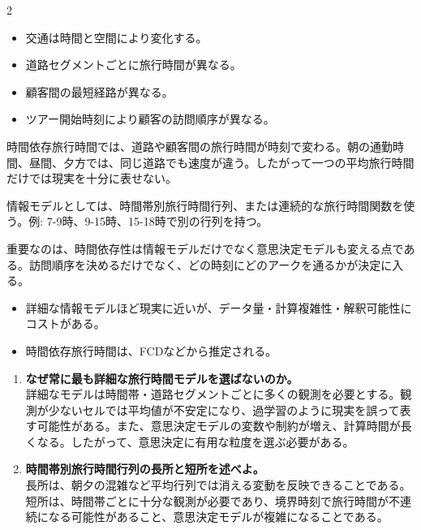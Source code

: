 \clearpage
{}
\begin{multicols}{2}\footnotesize\raggedcolumns
{}
\begin{itemize}
\item 交通は時間と空間により変化する。
\item 道路セグメントごとに旅行時間が異なる。
\item 顧客間の最短経路が異なる。
\item ツアー開始時刻により顧客の訪問順序が異なる。
\end{itemize}
時間依存旅行時間では、道路や顧客間の旅行時間が時刻で変わる。朝の通勤時間、昼間、夕方では、同じ道路でも速度が違う。したがって一つの平均旅行時間だけでは現実を十分に表せない。\par

情報モデルとしては、時間帯別旅行時間行列、または連続的な旅行時間関数を使う。例: 7-9時、9-15時、15-18時で別の行列を持つ。\par

重要なのは、時間依存性は情報モデルだけでなく意思決定モデルも変える点である。訪問順序を決めるだけでなく、どの時刻にどのアークを通るかが決定に入る。\par
{}
\begin{itemize}
\item 詳細な情報モデルほど現実に近いが、データ量・計算複雑性・解釈可能性にコストがある。
\item 時間依存旅行時間は、FCDなどから推定される。
\end{itemize}
\begin{enumerate}
\item \textbf{なぜ常に最も詳細な旅行時間モデルを選ばないのか。}\\詳細なモデルは時間帯・道路セグメントごとに多くの観測を必要とする。観測が少ないセルでは平均値が不安定になり、過学習のように現実を誤って表す可能性がある。また、意思決定モデルの変数や制約が増え、計算時間が長くなる。したがって、意思決定に有用な粒度を選ぶ必要がある。
\item \textbf{時間帯別旅行時間行列の長所と短所を述べよ。}\\長所は、朝夕の混雑など平均行列では消える変動を反映できることである。短所は、時間帯ごとに十分な観測が必要であり、境界時刻で旅行時間が不連続になる可能性があること、意思決定モデルが複雑になることである。
\end{enumerate}
\end{multicols}

